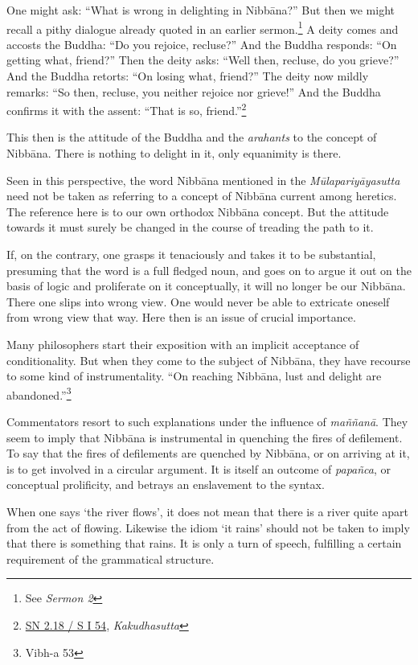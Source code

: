 One might ask: ``What is wrong in delighting in Nibbāna?'' But then we might recall a pithy dialogue already quoted in an earlier sermon.\footnote{See \emph{Sermon 2}} A deity comes and accosts the Buddha: ``Do you rejoice, recluse?'' And the Buddha responds: ``On getting what, friend?'' Then the deity asks: ``Well then, recluse, do you grieve?'' And the Buddha retorts: ``On losing what, friend?'' The deity now mildly remarks: ``So then, recluse, you neither rejoice nor grieve!'' And the Buddha confirms it with the assent: ``That is so, friend.''\footnote{\href{https://suttacentral.net/sn2.18/pli/ms}{SN 2.18 / S I 54}, \emph{Kakudhasutta}}

This then is the attitude of the Buddha and the \emph{arahants} to the concept of Nibbāna. There is nothing to delight in it, only equanimity is there.

Seen in this perspective, the word Nibbāna mentioned in the \emph{Mūlapariyāyasutta} need not be taken as referring to a concept of Nibbāna current among heretics. The reference here is to our own orthodox Nibbāna concept. But the attitude towards it must surely be changed in the course of treading the path to it.

If, on the contrary, one grasps it tenaciously and takes it to be substantial, presuming that the word is a full fledged noun, and goes on to argue it out on the basis of logic and proliferate on it conceptually, it will no longer be our Nibbāna. There one slips into wrong view. One would never be able to extricate oneself from wrong view that way. Here then is an issue of crucial importance.

Many philosophers start their exposition with an implicit acceptance of conditionality. But when they come to the subject of Nibbāna, they have recourse to some kind of instrumentality. ``On reaching Nibbāna, lust and delight are abandoned.''\footnote{Vibh-a 53}

Commentators resort to such explanations under the influence of \emph{maññanā}. They seem to imply that Nibbāna is instrumental in quenching the fires of defilement. To say that the fires of defilements are quenched by Nibbāna, or on arriving at it, is to get involved in a circular argument. It is itself an outcome of \emph{papañca}, or conceptual prolificity, and betrays an enslavement to the syntax.

When one says `the river flows', it does not mean that there is a river quite apart from the act of flowing. Likewise the idiom `it rains' should not be taken to imply that there is something that rains. It is only a turn of speech, fulfilling a certain requirement of the grammatical structure.

